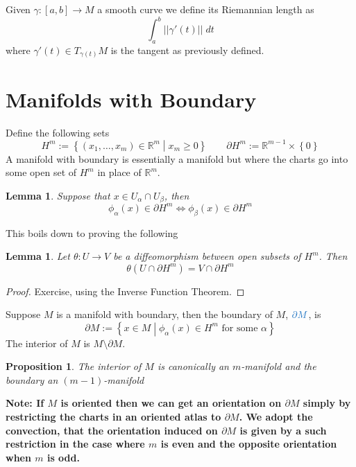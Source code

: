 \documentclass[11pt]{article}
\newcommand{\defeq}{:=}
\newcommand{\norm}[1]{||#1||}
\newcommand{\relmiddle}[1]{\mathrel{}\middle#1\mathrel{}}
\newcommand{\rmv}{\relmiddle|}
\newcommand{\R}{\mathbb{R}}
\newenvironment{defin}
	{\begin{mdframed}[backgroundcolor=white, roundcorner=5pt, linewidth=1pt, linecolor=RoyalBlue]
		\setlength{\parindent}{0pt}}
	{\end{mdframed}}
\newcommand{\mdf}[1]{{\color{RoyalBlue} #1}}
\newenvironment{note}
	{\begin{mdframed}[backgroundcolor=white, linecolor=RubineRed, roundcorner=5pt, linewidth=1pt]\bfseries{Note:}\normalfont
	\setlength{\parindent}{0pt}}
	{\end{mdframed}}
\newtheorem{lemma}[theorem]{Lemma}
\newtheorem{prop}[theorem]{Proposition}
\begin{document}
\begin{defin}
	Given $\gamma:[a, b]\to M$ a smooth curve we define its \mdf{Riemannian length} as
	\[
		\int_a^b \norm{\gamma'(t)}\; dt
	\]
	where $\gamma'(t) \in T_{\gamma(t)}M$ is the tangent as previously defined.
\end{defin}

\section{Manifolds with Boundary}
Define the following sets
\[
	H^m\defeq \left\{ (x_1, \dots , x_m) \in \R^m \rmv x_m \geq 0\right\} \quad \quad \partial H^m \defeq \R^{m-1} \times \left\{ 0\right\}
\]
A \mdf{manifold with boundary} is essentially a manifold but where the charts go into some open set of $H^m$ in place of $\R^m$.

\begin{lemma}
Suppose that $x\in U_\alpha \cap U_\beta$, then
\[
	\phi_\alpha(x)\in \partial H^m \iff \phi_\beta(x)\in\partial H^m
\]
\end{lemma}

This boils down to proving the following 

\begin{lemma}
Let $\theta: U \to V$ be a diffeomorphism between open subsets of $H^m$.
Then 
\[
\theta(U\cap \partial H^m) = V\cap \partial H^m
\]
\end{lemma}

\begin{proof}
Exercise, using the Inverse Function Theorem.
\end{proof}

\begin{defin}
	Suppose $M$ is a manifold with boundary, then the \mdf{boundary of $M$}, $\mdf{\partial M}$, is
	\[
		\partial M \defeq \left\{ x\in M \rmv \phi_\alpha(x) \in H^m \text{ for some } \alpha\right\}
	\]
	The \mdf{interior of $M$} is $M\setminus\partial M$.
\end{defin}

\begin{prop}
The interior of $M$ is canonically an $m$-manifold and the boundary an $( m-1 )$-manifold
\end{prop}

\begin{note}
If $M$ is oriented then we can get an orientation on $\partial M$ simply by restricting the charts in an oriented atlas to $\partial M$.
We adopt the convection, that the orientation induced on $\partial M$ is given by a such restriction in the case where $m$ is even and the opposite orientation when $m$ is odd.
\end{note}
\end{document}
